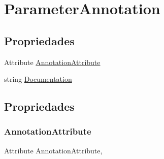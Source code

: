 \hypertarget{classApi3Layers_1_1Areas_1_1HelpPage_1_1ModelDescriptions_1_1ParameterAnnotation}{}\section{Parameter\+Annotation}
\label{classApi3Layers_1_1Areas_1_1HelpPage_1_1ModelDescriptions_1_1ParameterAnnotation}
\subsection*{Propriedades}
\begin{DoxyCompactItemize}
\item 
Attribute \hyperlink{classApi3Layers_1_1Areas_1_1HelpPage_1_1ModelDescriptions_1_1ParameterAnnotation_a392dedd976c4dc366de9e5b213c4e716}{Annotation\+Attribute}
\item 
string \hyperlink{classApi3Layers_1_1Areas_1_1HelpPage_1_1ModelDescriptions_1_1ParameterAnnotation_a239e2715951fcab2d9b263ef6acfa899}{Documentation}
\end{DoxyCompactItemize}


\subsection{Propriedades}
\mbox{\label{classApi3Layers_1_1Areas_1_1HelpPage_1_1ModelDescriptions_1_1ParameterAnnotation_a392dedd976c4dc366de9e5b213c4e716}} 
\subsubsection{\texorpdfstring{Annotation\+Attribute}{AnnotationAttribute}}
{\footnotesize\ttfamily Attribute Annotation\+Attribute\hspace{0.3cm}{\ttfamily [get]}, {\ttfamily [set]}}

